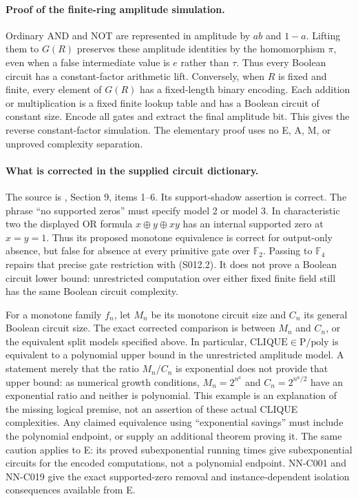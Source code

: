 \paragraph{Proof of the finite-ring amplitude simulation.}
Ordinary AND and NOT are represented in amplitude by $ab$ and $1-a$.
Lifting them to $G(R)$ preserves these amplitude identities by the
homomorphism $\pi$, even when a false intermediate value is $e$ rather
than $\tau$. Thus every Boolean circuit has a constant-factor
arithmetic lift. Conversely, when $R$ is fixed and finite, every
element of $G(R)$ has a fixed-length binary encoding. Each addition
or multiplication is a fixed finite lookup table and has a Boolean
circuit of constant size. Encode all gates and extract the final
amplitude bit. This gives the reverse constant-factor simulation.
The elementary proof uses no E, A, M, or unproved complexity separation.

\paragraph{What is corrected in the supplied circuit dictionary.}
The source is ,
Section 9, items 1--6. Its support-shadow assertion is correct.
The phrase ``no supported zeros'' must specify model 2 or model 3.
In characteristic two the displayed OR formula
$x\oplus y\oplus xy$ has an internal supported zero at $x=y=1$.
Thus its proposed monotone equivalence is correct for output-only
absence, but false for absence at every primitive gate over
$\mathbb F_2$. Passing to $\mathbb F_4$ repairs that precise gate
restriction with (S012.2). It does not prove a Boolean circuit lower
bound: unrestricted computation over either fixed finite field still
has the same Boolean circuit complexity.

For a monotone family $f_n$, let $M_n$ be its monotone circuit size
and $C_n$ its general Boolean circuit size. The exact corrected
comparison is between $M_n$ and $C_n$, or the equivalent split models
specified above. In particular, $\mathrm{CLIQUE}\in\mathrm P/\mathrm{poly}$
is equivalent to a polynomial upper bound in the unrestricted amplitude
model. A statement merely that the ratio $M_n/C_n$ is exponential
does not provide that upper bound: as numerical growth conditions,
$M_n=2^{n^a}$ and $C_n=2^{n^a/2}$ have an exponential ratio and neither
is polynomial. This example is an explanation of the missing logical
premise, not an assertion of these actual CLIQUE complexities.
Any claimed equivalence using ``exponential savings'' must include
the polynomial endpoint, or supply an additional theorem proving it.
The same caution applies to E: its proved subexponential running times
give subexponential circuits for the encoded computations, not a
polynomial endpoint. NN-C001 and NN-C019 give the exact supported-zero
removal and instance-dependent isolation consequences available from E.

